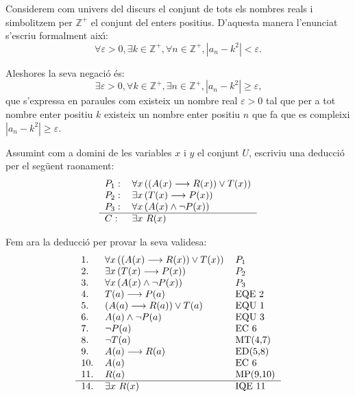 \begin{solucio}
Considerem com univers del discurs el conjunt de tots els nombres reals i
simbolitzem per $\mathbb{Z}^{+}$ el conjunt del enters positius. D'aquesta
manera l'enunciat s'escriu formalment aix\'{\i}:
\[
\forall\varepsilon>0,\exists k\in\mathbb{Z}^{+},\forall n\in\mathbb{Z}%
^{+},\left\vert a_{n}-k^{2}\right\vert <\varepsilon\text{.}%
\]


Aleshores la seva negaci\'{o} \'{e}s:%
\[
\exists\varepsilon>0,\forall k\in\mathbb{Z}^{+},\exists n\in\mathbb{Z}%
^{+},\left\vert a_{n}-k^{2}\right\vert \geq\varepsilon\text{,}%
\]
que s'expressa en paraules com existeix un nombre real $\varepsilon>0$ tal que
per a tot nombre enter positiu $k$ existeix un nombre enter positiu $n$ que fa
que es compleixi $\left\vert a_{n}-k^{2}\right\vert \geq\varepsilon$.
\end{solucio}

\begin{exercici}
Assumint com a domini de les variables $x$ i $y$ el conjunt $U$, escriviu una
deducci\'{o} per el seg\"{u}ent raonament:%
\[%
\begin{tabular}
[c]{ll}%
$P_{1}:$ & $\forall x\left(  \left(  A(x)\longrightarrow R(x)\right)  \vee
T(x)\right)  $\\
$P_{2}:$ & $\exists x\left(  T(x)\longrightarrow P(x)\right)  $\\
$P_{3}:$ & $\forall x\left(  A(x)\wedge\lnot P(x)\right)  $\\\hline
$C:$ & $\exists x\ R(x)$%
\end{tabular}
\]

\end{exercici}

\begin{solucio}
Fem ara la deducci\'{o} per provar la seva validesa:%
\[%
\begin{tabular}
[c]{lll}%
1. & $\forall x\left(  \left(  A(x)\longrightarrow R(x)\right)  \vee
T(x)\right)  $ & $P_{1}$\\
2. & $\exists x\left(  T(x)\longrightarrow P(x)\right)  $ & $P_{2}$\\
3. & $\forall x\left(  A(x)\wedge\lnot P(x)\right)  $ & $P_{3}$\\
4. & $T(a)\longrightarrow P(a)$ & EQE 2\\
5. & $\left(  A(a)\longrightarrow R(a)\right)  \vee T(a)$ & EQU 1\\
6. & $A(a)\wedge\lnot P(a)$ & EQU 3\\
7. & $\lnot P(a)$ & EC 6\\
8. & $\lnot T(a)$ & MT(4,7)\\
9. & $A(a)\longrightarrow R(a)$ & ED(5,8)\\
10. & $A(a)$ & EC 6\\
11. & $R(a)$ & MP(9,10)\\\hline
14. & $\exists x~R(x)$ & IQE 11
\end{tabular}
\]

\end{solucio}

